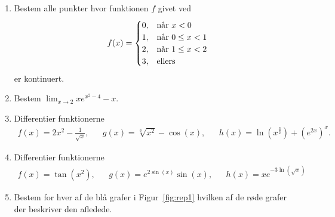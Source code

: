 \begin{enumerate}
	\item Bestem alle punkter hvor funktionen $f$ givet ved
	\begin{align*}
	f(x)=\begin{cases}
	0,& \textup{når } x<0\\
	1,& \textup{når } 0\leq x<1\\
	2,&\textup{når } 1\leq x<2\\
	3,&\textup{ellers}
	\end{cases}
	\end{align*}
	er kontinuert.
	
	\item Bestem $\lim_{x\to 2} xe^{x^2-4}-x$.
	
	\item Differentier funktionerne
	\begin{align*}
	f(x)=2x^2-\frac{1}{\sqrt{x}},&&g(x)=\sqrt[3]{x^2}-\cos(x),&& h(x)=\ln(x^{\frac{3}{2}})+(e^{2x})^{x}.
	\end{align*}
	
	\item Differentier funktionerne
	\begin{align*}
	f(x)=\tan(x^2),&& g(x)=e^{2\sin(x)}\sin(x),&& h(x)=xe^{-3\ln(\sqrt{x})}
	\end{align*}
	
	
	\item\label{it:rep1} Bestem for hver af de blå grafer i Figur~\ref{fig:rep1} hvilken af de røde grafer
	der beskriver den afledede.
	\begin{figure}
		\centering
		

\end{figure}
\end{enumerate}
